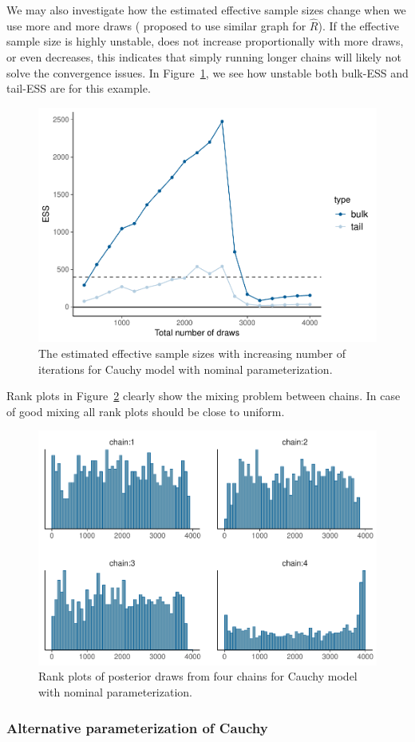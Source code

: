 \documentclass[american,]{article}
\begin{document}
We may also investigate how the estimated effective sample sizes
change when we use more and more draws (\citet{Brooks+Gelman:1998}
proposed to use similar graph for \(\widehat{R}\)). If the effective
sample size is highly unstable, does not increase proportionally with
more draws, or even decreases, this indicates that simply running
longer chains will likely not solve the convergence issues. In
Figure~\ref{fig:change-ess-fit-nom-1}, we see how unstable both
bulk-ESS and tail-ESS are for this example.
\begin{figure}[tp]
  \centering
  \includegraphics[width=0.6\linewidth]{graphics/change-ess-fit-nom-1.pdf}
  \caption{The estimated effective sample sizes with increasing number of iterations for Cauchy model with nominal parameterization.}
  \label{fig:change-ess-fit-nom-1}
\end{figure}
Rank plots in Figure~\ref{fig:hist-fit-nom-1.pdf} clearly show the
mixing problem between chains. In case of good mixing all rank plots
should be close to uniform.
\begin{figure}[tp]
  \centering
  \includegraphics[width=0.6\linewidth]{graphics/hist-fit-nom-1.pdf}
  \caption{Rank plots of posterior draws from four chains for Cauchy model with nominal parameterization.}
  \label{fig:hist-fit-nom-1.pdf}
\end{figure}

\hypertarget{alternative-parameterization-of-cauchy}{%
\subsubsection{Alternative parameterization of
Cauchy}\label{alternative-parameterization-of-cauchy}}
\end{document}
